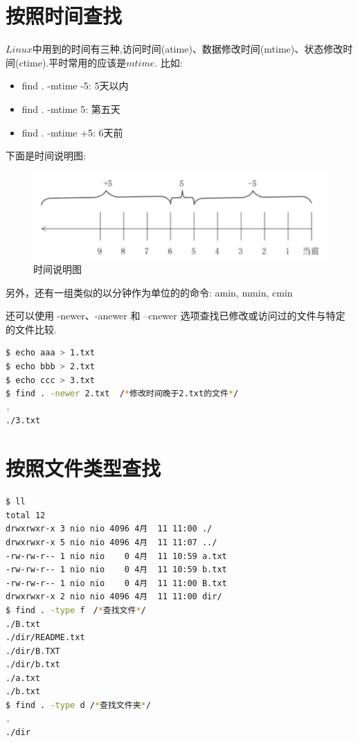 \documentclass{article}
\begin{document}
\section{按照时间查找}
$Linux$中用到的时间有三种,访问时间(atime)、数据修改时间(mtime)、状态修改时间(ctime).平时常用的应该是$mtime$. 比如: \par

\begin{itemize}
	\item find . -mtime -5: 5天以内
	\item find . -mtime 5: 第五天
	\item find . -mtime +5: 6天前
\end{itemize}
下面是时间说明图:
\begin{figure}[H]
	\centering
	\includegraphics[scale=0.4]{pic3.png} \par
	\caption{时间说明图}
\end{figure}
另外，还有一组类似的以分钟作为单位的的命令: amin, mmin, cmin\par
还可以使用 -newer、-anewer 和 –cnewer 选项查找已修改或访问过的文件与特定的文件比较. \par
\begin{lstlisting}[language=bash]
$ echo aaa > 1.txt
$ echo bbb > 2.txt
$ echo ccc > 3.txt
$ find . -newer 2.txt  /*修改时间晚于2.txt的文件*/
.
./3.txt
\end{lstlisting}

\section{按照文件类型查找}
\begin{lstlisting}[language=bash]
$ ll
total 12
drwxrwxr-x 3 nio nio 4096 4月  11 11:00 ./
drwxrwxr-x 5 nio nio 4096 4月  11 11:07 ../
-rw-rw-r-- 1 nio nio    0 4月  11 10:59 a.txt
-rw-rw-r-- 1 nio nio    0 4月  11 10:59 b.txt
-rw-rw-r-- 1 nio nio    0 4月  11 11:00 B.txt
drwxrwxr-x 2 nio nio 4096 4月  11 11:00 dir/
$ find . -type f　/*查找文件*/
./B.txt
./dir/README.txt
./dir/B.TXT
./dir/b.txt
./a.txt
./b.txt
$ find . -type d /*查找文件夹*/
.
./dir
\end{lstlisting}
\end{document}
